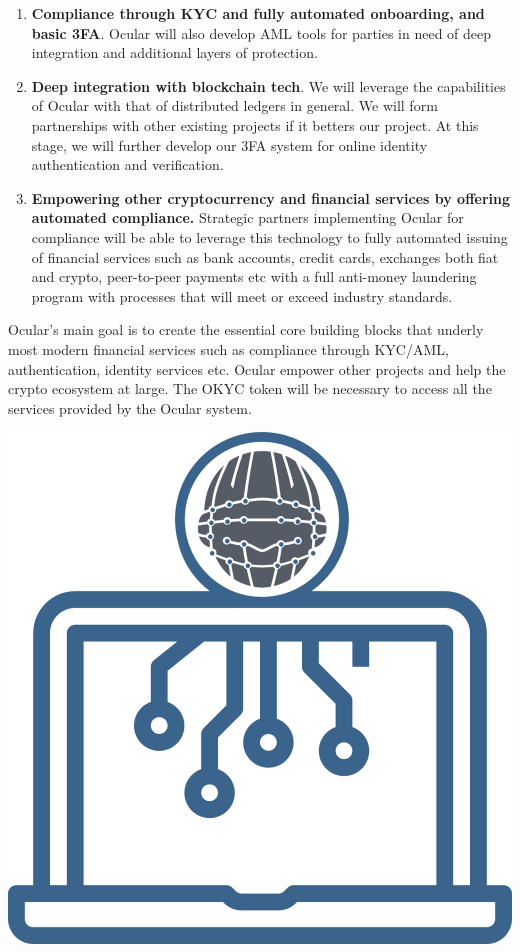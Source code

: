 \documentclass[a4paper]{article}
\begin{document}
\begin{enumerate}
\item \textbf{Compliance through KYC and fully automated onboarding, and basic 3FA}. Ocular will also develop AML tools for parties in need of deep integration and additional layers of protection. 

\item \textbf{Deep integration with blockchain tech}. We will leverage the capabilities of Ocular with that of distributed ledgers in general. We will form partnerships with other existing projects if it betters our project. At this stage, we will further develop our 3FA system for online identity authentication and verification. 

\item \textbf{Empowering other cryptocurrency and financial services by offering automated compliance.} Strategic partners implementing Ocular for compliance will be able to leverage this technology to fully automated issuing of financial services such as bank accounts, credit cards, exchanges both fiat and crypto, peer-to-peer payments etc with a full anti-money laundering program with processes that will meet or exceed industry standards. 


\end{enumerate}

Ocular's main goal is to create the essential core building blocks that underly most modern financial services such as compliance through KYC/AML, authentication, identity services etc. Ocular empower other projects and help the crypto ecosystem at large. The OKYC token will be necessary to access all the services provided by the Ocular system.

\clearpage

\centerline{\includegraphics[width=1.0\textwidth]{ocular-crypto}}
\end{document}
